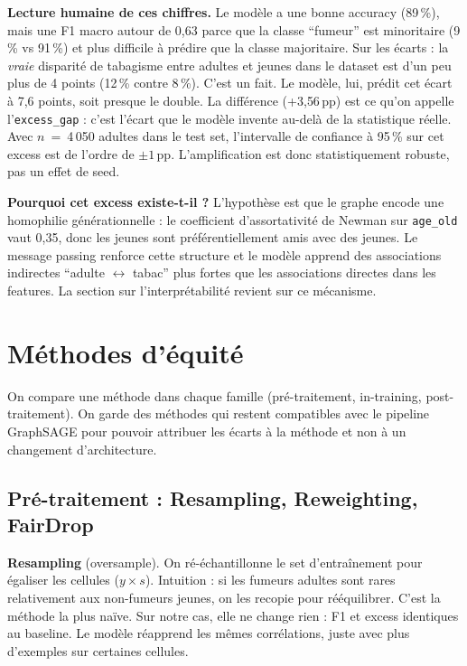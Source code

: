 \documentclass[10pt,a4paper,twocolumn]{article}
\begin{document}
\textbf{Lecture humaine de ces chiffres.} Le modèle a une bonne accuracy (89\,\%), mais une F1 macro autour de 0{,}63 parce que la classe ``fumeur'' est minoritaire (9\,\% vs 91\,\%) et plus difficile à prédire que la classe majoritaire. Sur les écarts : la \emph{vraie} disparité de tabagisme entre adultes et jeunes dans le dataset est d'un peu plus de 4 points (12\,\% contre 8\,\%). C'est un fait. Le modèle, lui, prédit cet écart à 7{,}6 points, soit presque le double. La différence (+3{,}56\,pp) est ce qu'on appelle l'\texttt{excess\_gap} : c'est l'écart que le modèle invente au-delà de la statistique réelle. Avec $n$~=~4\,050 adultes dans le test set, l'intervalle de confiance à 95\,\% sur cet excess est de l'ordre de $\pm 1$\,pp. L'amplification est donc statistiquement robuste, pas un effet de seed.

\textbf{Pourquoi cet excess existe-t-il ?} L'hypothèse est que le graphe encode une homophilie générationnelle : le coefficient d'assortativité de Newman sur \texttt{age\_old} vaut 0{,}35, donc les jeunes sont préférentiellement amis avec des jeunes. Le message passing renforce cette structure et le modèle apprend des associations indirectes ``adulte $\leftrightarrow$ tabac'' plus fortes que les associations directes dans les features. La section sur l'interprétabilité revient sur ce mécanisme.

\section{Méthodes d'équité}

On compare une méthode dans chaque famille (pré-traitement, in-training, post-traitement). On garde des méthodes qui restent compatibles avec le pipeline GraphSAGE pour pouvoir attribuer les écarts à la méthode et non à un changement d'architecture.

\subsection{Pré-traitement : Resampling, Reweighting, FairDrop}

\textbf{Resampling} (oversample). On ré-échantillonne le set d'entraînement pour égaliser les cellules ($y \times s$). Intuition : si les fumeurs adultes sont rares relativement aux non-fumeurs jeunes, on les recopie pour rééquilibrer. C'est la méthode la plus naïve. Sur notre cas, elle ne change rien : F1 et excess identiques au baseline. Le modèle réapprend les mêmes corrélations, juste avec plus d'exemples sur certaines cellules.
\end{document}
